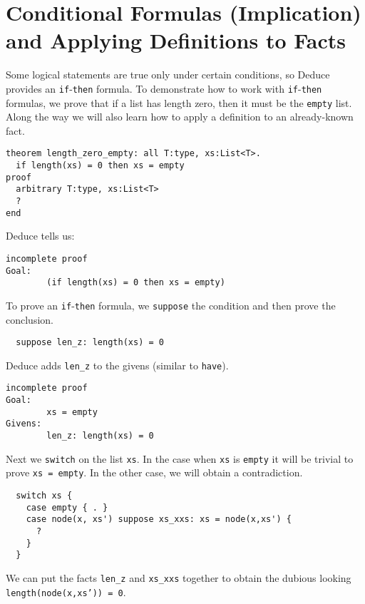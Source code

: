 \documentclass[12pt]{article}
\begin{document}
\section{Conditional Formulas (Implication) and Applying Definitions to Facts}
\label{sec:implication}

Some logical statements are true only under certain conditions, so
Deduce provides an \texttt{if}-\texttt{then} formula.  To demonstrate
how to work with \texttt{if}-\texttt{then} formulas, we prove that if
a list has length zero, then it must be the \texttt{empty} list. Along
the way we will also learn how to apply a definition to an
already-known fact.

\begin{verbatim}
theorem length_zero_empty: all T:type, xs:List<T>.
  if length(xs) = 0 then xs = empty
proof
  arbitrary T:type, xs:List<T>
  ?
end
\end{verbatim}

\noindent Deduce tells us:

\begin{verbatim}
incomplete proof
Goal:
        (if length(xs) = 0 then xs = empty)
\end{verbatim}

To prove an \texttt{if}-\texttt{then} formula, we \texttt{suppose} the
condition and then prove the conclusion.

\begin{verbatim}
  suppose len_z: length(xs) = 0
\end{verbatim}

Deduce adds \texttt{len\_z} to the givens (similar to \texttt{have}).

\begin{verbatim}
incomplete proof
Goal:
        xs = empty
Givens:
        len_z: length(xs) = 0
\end{verbatim}

Next we \texttt{switch} on the list \texttt{xs}. In the case when
\texttt{xs} is \texttt{empty} it will be trivial to prove \texttt{xs =
  empty}. In the other case, we will obtain a contradiction.

\begin{verbatim}
  switch xs {
    case empty { . }
    case node(x, xs') suppose xs_xxs: xs = node(x,xs') {
      ?
    }
  }
\end{verbatim}

We can put the facts \texttt{len\_z} and \texttt{xs\_xxs} together
to obtain the dubious looking \texttt{length(node(x,xs')) = 0}.
\end{document}
